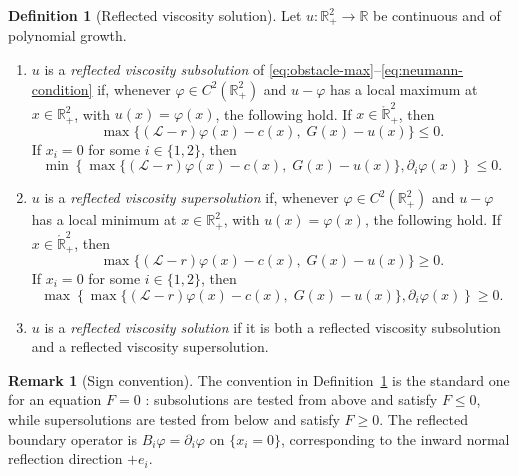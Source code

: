 \documentclass[pdflatex,sn-mathphys-num]{sn-jnl}
\theoremstyle{plain}
\theoremstyle{definition}
\newtheorem{definition}[theorem]{Definition}
\newtheorem{remark}[theorem]{Remark}
\newcommand{\R}{\mathbb{R}}
\newcommand{\interior}[1]{\mathring{#1}}
\begin{document}
\begin{definition}[Reflected viscosity solution]
\label{def:reflected-viscosity}
Let $u:\R^2_+\to\R$ be continuous and of polynomial growth.
\begin{enumerate}
\item[\textup{(i)}]
$u$ is a \emph{reflected viscosity subsolution} of
\eqref{eq:obstacle-max}--\eqref{eq:neumann-condition} if, whenever
$\varphi\in C^2(\R^2_+)$ and $u-\varphi$ has a local maximum at $x\in\R^2_+$,
with $u(x)=\varphi(x)$, the following hold. If $x\in\interior{\R}^2_+$, then
\[
   \max\{(\mathcal L-r)\varphi(x)-c(x),\;G(x)-u(x)\}\le0.
\]
If $x_i=0$ for some $i\in\{1,2\}$, then
\[
   \min\left\{
      \max\{(\mathcal L-r)\varphi(x)-c(x),\;G(x)-u(x)\},
      \partial_i\varphi(x)
   \right\}\le0.
\]
\item[\textup{(ii)}]
$u$ is a \emph{reflected viscosity supersolution} if, whenever
$\varphi\in C^2(\R^2_+)$ and $u-\varphi$ has a local minimum at $x\in\R^2_+$,
with $u(x)=\varphi(x)$, the following hold. If $x\in\interior{\R}^2_+$, then
\[
   \max\{(\mathcal L-r)\varphi(x)-c(x),\;G(x)-u(x)\}\ge0.
\]
If $x_i=0$ for some $i\in\{1,2\}$, then
\[
   \max\left\{
      \max\{(\mathcal L-r)\varphi(x)-c(x),\;G(x)-u(x)\},
      \partial_i\varphi(x)
   \right\}\ge0.
\]
\item[\textup{(iii)}]
$u$ is a \emph{reflected viscosity solution} if it is both a reflected
viscosity subsolution and a reflected viscosity supersolution.
\end{enumerate}
\end{definition}

\begin{remark}[Sign convention]
\label{rem:viscosity-sign}
The convention in Definition~\ref{def:reflected-viscosity} is the standard one
for an equation $F=0$ \cite{crandall1992user}: subsolutions are tested
from above and satisfy $F\le0$, while supersolutions are tested from below and
satisfy $F\ge0$. The reflected boundary operator is $B_i\varphi=\partial_i\varphi$
on $\{x_i=0\}$, corresponding to the inward normal reflection direction $+e_i$.
\end{remark}
\end{document}
